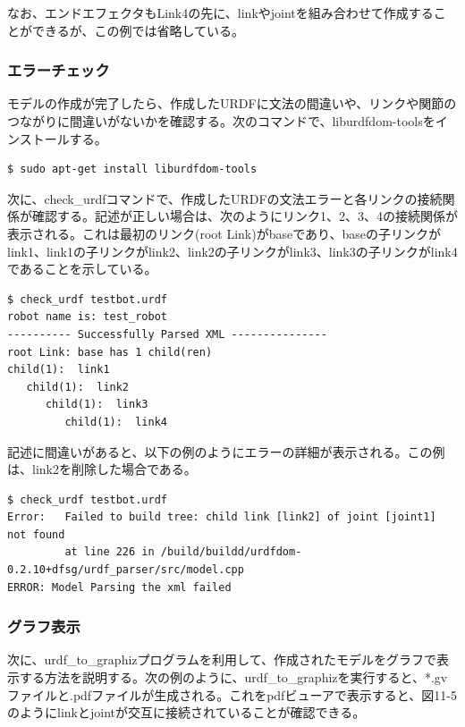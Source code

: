 なお、エンドエフェクタもLink4の先に、linkやjointを組み合わせて作成することができるが、この例では省略している。

\subsubsection{エラーチェック}

モデルの作成が完了したら、作成したURDFに文法の間違いや、リンクや関節のつながりに間違いがないかを確認する。次のコマンドで、liburdfdom-toolsをインストールする。

\begin{lstlisting}[language=ROS]
$ sudo apt-get install liburdfdom-tools
\end{lstlisting}

次に、check\_urdfコマンドで、作成したURDFの文法エラーと各リンクの接続関係が確認する。記述が正しい場合は、次のようにリンク1、2、3、4の接続関係が表示される。これは最初のリンク(root Link)がbaseであり、baseの子リンクがlink1、link1の子リンクがlink2、link2の子リンクがlink3、link3の子リンクがlink4であることを示している。

\begin{lstlisting}[language=ROS]
$ check_urdf testbot.urdf
robot name is: test_robot
---------- Successfully Parsed XML ---------------
root Link: base has 1 child(ren)
child(1):  link1
   child(1):  link2
      child(1):  link3
         child(1):  link4
\end{lstlisting}

記述に間違いがあると、以下の例のようにエラーの詳細が表示される。この例は、link2を削除した場合である。

\begin{lstlisting}[language=ROS]
$ check_urdf testbot.urdf
Error:   Failed to build tree: child link [link2] of joint [joint1] not found
         at line 226 in /build/buildd/urdfdom-0.2.10+dfsg/urdf_parser/src/model.cpp
ERROR: Model Parsing the xml failed
\end{lstlisting}

\subsubsection{グラフ表示}

次に、urdf\_to\_graphizプログラムを利用して、作成されたモデルをグラフで表示する方法を説明する。次の例のように、urdf\_to\_graphizを実行すると、*.gvファイルと.pdfファイルが生成される。これをpdfビューアで表示すると、図11-5のようにlinkとjointが交互に接続されていることが確認できる。

